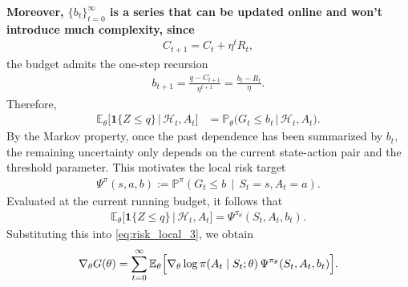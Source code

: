 \textbf{\textcolor{ECNURed}{
Moreover, $\{b_t\}_{t=0}^{\infty}$ is a series that can be updated online and won't introduce much complexity, since
}}
\begin{align}
    C_{t+1}
    =
    C_t+\eta^tR_t,
\end{align}
the budget admits the one-step recursion
\begin{align}\label{budget_update}
    b_{t+1}
    =
    \frac{q-C_{t+1}}{\eta^{t+1}}
    =
    \frac{b_t-R_t}{\eta}.
\end{align}
Therefore,
\begin{align}
    \mathbb{E}_{\theta}\bigl[
        \mathbf{1}\{Z\le q\}
        \,\big|\,
        \mathcal{H}_t,A_t
    \bigr]
    &=
    \mathbb{P}_{\theta}\bigl(
        G_t\le b_t
        \,\big|\,
        \mathcal{H}_t,A_t
    \bigr).
\end{align}
By the Markov property, once the past dependence has been summarized by $b_t$, the remaining uncertainty only depends on the current state-action pair and the threshold parameter. This motivates the local risk target
\begin{align}
    \Psi^{\pi}(s,a,b)
    :=
    \mathbb{P}^{\pi}\!\left(
        G_t\le b
        \,\middle|\,
        S_t=s,A_t=a
    \right).
\end{align}
Evaluated at the current running budget, it follows that
\begin{align}
    \mathbb{E}_{\theta}\bigl[
        \mathbf{1}\{Z\le q\}
        \,\big|\,
        \mathcal{H}_t,A_t
    \bigr]
    =
    \Psi^{\pi_{\theta}}(S_t,A_t,b_t).
\end{align}
Substituting this into \eqref{eq:risk_local_3}, we obtain
\begin{align}
    \nabla_{\theta}G(\theta)
    =
    \sum_{t=0}^{\infty}
    \mathbb{E}_{\theta}\Bigl[
        \nabla_{\theta}\log\pi(A_t\mid S_t;\theta)
        \,
        \Psi^{\pi_{\theta}}(S_t,A_t,b_t)
    \Bigr].
\end{align}

